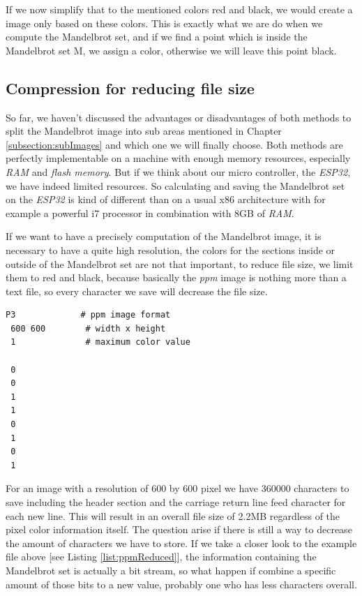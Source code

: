 If we now simplify that to the mentioned colors red and black, we would create a image only based on these colors. This is exactly what we are do when we compute the Mandelbrot set, and if we find a point which is inside the Mandelbrot set M, we assign a color, otherwise we will leave this point black.

\newpage

\subsection{Compression for reducing file size}

So far, we haven't discussed the advantages or disadvantages of both methods to split the Mandelbrot image into sub areas mentioned in Chapter \ref{subsection:subImages} and which one we will finally choose. Both methods are perfectly implementable on a machine with enough memory resources, especially \textit{RAM} and \textit{flash memory}. But if we think about our micro controller, the \textit{ESP32}, we have indeed limited resources. So calculating and saving the Mandelbrot set on the \textit{ESP32} is kind of different than on a usual x86 architecture with for example a powerful i7 processor in combination with 8GB of \textit{RAM}.  

If we want to have a precisely computation of the Mandelbrot image, it is necessary to have a quite high resolution, the colors for the sections inside or outside of the Mandelbrot set are not that important, to reduce file size, we limit them to red and black, because basically the \textit{ppm} image is nothing more than a text file, so every character we save will decrease the file size.

\begin{lstlisting}[caption=Reduced ppm image file format, label=list:ppmReduced]
 P3				# ppm image format
 600 600		# width x height
 1				# maximum color value
 
 0
 0
 1
 1
 0
 1
 0
 1
\end{lstlisting}

For an image with a resolution of 600 by 600 pixel we have 360000 characters to save including the header section and the carriage return line feed character for each new line. This will result in an overall file size of 2.2MB regardless of the pixel color information itself. The question arise if there is still a way to decrease the amount of characters we have to store. If we take a closer look to the example file above [see Listing \ref{list:ppmReduced}], the information containing the Mandelbrot set is actually a bit stream, so what happen if combine a specific amount of those bits to a new value, probably one who has less characters overall.

